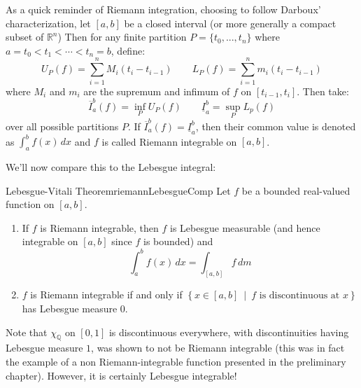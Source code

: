 \documentclass[oneside]{book}
\newcommand{\Q}{\mathbb{Q}}
\newcommand{\R}{\mathbb{R}}
\newcommand{\set}[2]{\left\{#1 \ \middle|\ #2\right\}}
\newcommand{\oln}{\overline}
\begin{document}
As a quick reminder of Riemann integration, choosing to follow Darboux' characterization, let $[a,b]$ be a closed
interval (or more generally a compact subset of $\R^n$) Then for any finite partition $P = \{t_0, ..., t_n\}$ where $a = t_0 < t_1 < \cdots < t_n
= b$, define:
\[
	U_P(f) = \sum_{i=1}^n M_i(t_i - t_{i-1}) \qquad L_P(f) = \sum_{i=1}^n m_i(t_i - t_{i-1})
\]
where $M_i$ and $m_i$ are the supremum and infimum of $f$ on $[t_{i-1}, t_i]$. Then take:
\[
	\oln{I}_a^b(f) = \inf_P U_P(f) \qquad \underline{I}_a^b = \sup_P L_p(f)
\]
over all possible partitions $P$. If $\oln{I}_a^b(f)  = \underline{I}_a^b$, then their common value is denoted as
$\int_a^b f(x)\,dx$ and $f$ is called Riemann integrable on $[a,b]$. 


We'll now compare this to the Lebesgue integral:

\begin{thm}{Lebesgue-Vitali Theorem}{riemannLebesgueComp}
	Let $f$ be a bounded real-valued function on $[a,b]$. 
	\begin{enumerate}
		\item If $f$ is Riemann integrable, then $f$ is Lebesgue measurable (and hence integrable on $[a,b]$ since $f$ is
			bounded) and
			\[
				\int_a^b f(x)\,dx = \int_{[a,b]} f\,dm
			\]
		\item $f$ is Riemann integrable if and only if $\set{x \in [a,b]}{\text{$f$ is discontinuous at $x$}}$ has
			Lebesgue measure $0$. 
	\end{enumerate}
\end{thm}

Note that $\chi_\Q$  on $[0,1]$ is discontinuous everywhere, with discontinuities having Lebesgue measure $1$, was shown
to not be Riemann integrable (this was in fact the example of a non Riemann-integrable function presented in the
preliminary chapter). However, it is certainly Lebesgue integrable!
\end{document}
